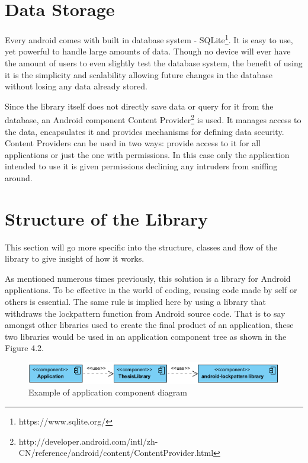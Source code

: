 \section{Data Storage}
Every android comes with built in database system - SQLite\footnote[12]{https://www.sqlite.org/}. It is easy to use, yet powerful to handle large amounts of data. Though no device will ever have the amount of users to even slightly test the database system, the benefit of using it is the simplicity and scalability allowing future changes in the database without losing any data already stored.

Since the library itself does not directly save data or query for it from the database, an Android component Content Provider\footnote[13]{http://developer.android.com/intl/zh-CN/reference/android/content/ContentProvider.html} is used. It manages access to the data, encapsulates it and provides mechanisms for defining data security. Content Providers can be used in two ways: provide access to it for all applications or just the one with permissions. In this case only the application intended to use it is given permissions declining any intruders from sniffing around.

\section{Structure of the Library}
This section will go more specific into the structure, classes and flow of the library to give insight of how it works.

As mentioned numerous times previously, this solution is a library for Android applications. To be effective in the world of coding, reusing code made by self or others is essential. The same rule is implied here by using a library that withdraws the lockpattern function from Android source code. That is to say amongst other libraries used to create the final product of an application, these two libraries would be used in an application component tree as shown in the Figure 4.2.

\begin{figure}[h]
\begin{center}
\includegraphics[scale=0.9]{images/componentdiagram.png}
\caption{Example of application component diagram} \label{fig:component diagram} 
\end{center}
\end{figure}

